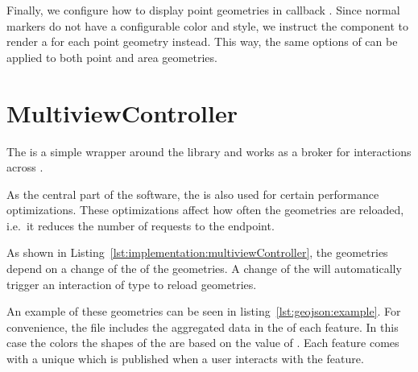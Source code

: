 

Finally, we configure how to display point geometries in callback .
Since normal markers do not have a configurable color and style, we instruct the  component to render a  for each point geometry instead.
This way, the same options of  can be applied to both point and area geometries.

\section{MultiviewController}

The  is a simple wrapper around the library  and works as a broker for interactions across \cmvs{}.


As the central part of the software, the  is also used for certain performance optimizations.
These optimizations affect how often the geometries are reloaded, i.e.\ it reduces the number of requests to the  endpoint.




As shown in Listing~\ref{lst:implementation:multiviewController}, the geometries depend on a change of the  of the geometries.
A change of the  will automatically trigger an interaction of type  to reload geometries.

An example of these geometries can be seen in listing~\ref{lst:geojson:example}.
For convenience, the file includes the aggregated data in the  of each feature.
In this case the colors the shapes of the \tmap{} are based on the value of .
Each feature comes with a unique  which is published when a user interacts with the feature.





